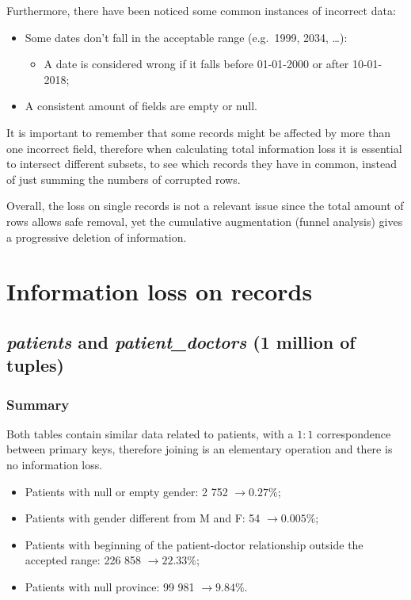 Furthermore, there have been noticed some common instances of incorrect data:
\begin{itemize}
	\item Some dates don't fall in the acceptable range (e.g.\ 1999, 2034, \dots):
	\begin{itemize}
		\item A date is considered wrong if it falls before 01-01-2000 or after 10-01-2018;
	\end{itemize}
	\item A consistent amount of fields are empty or null.
\end{itemize}

It is important to remember that some records might be affected by more than one incorrect field, therefore when calculating total information loss it is essential to intersect different subsets, to see which records they have in common, instead of just summing the numbers of corrupted rows.

Overall, the loss on single records is not a relevant issue since the total amount of rows allows safe removal, yet the cumulative augmentation (funnel analysis) gives a progressive deletion of information.

\section{Information loss on records}

\subsection{\textit{patients} and \textit{patient\_doctors} (1 million of tuples)}
\subsubsection{Summary}
Both tables contain similar data related to patients, with a $1 : 1$ correspondence between primary keys, therefore joining is an elementary operation and there is no information loss.

\begin{itemize}
	\item Patients with null or empty gender: 2 752 $\rightarrow 0.27\%$;
	\item Patients with gender different from M and F: 54 $\rightarrow 0.005\%$;
	\item Patients with beginning of the patient-doctor relationship outside the accepted range: 226 858 $\rightarrow 22.33\%$;
	\item Patients with null province: 99 981 $\rightarrow 9.84\%$.
\end{itemize}

